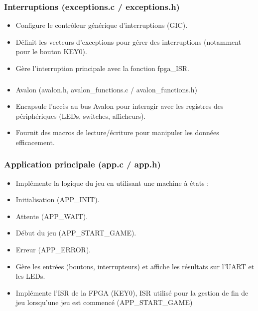 \documentclass[a4paper,12pt]{article}
\begin{document}
\subsubsection{Interruptions (exceptions.c / exceptions.h)}

\begin{itemize}
    \item Configure le contrôleur générique d’interruptions (GIC).
    \item Définit les vecteurs d’exceptions pour gérer des interruptions (notamment pour le bouton KEY0).
    \item Gère l'interruption principale avec la fonction fpga\_ISR.
\end{itemize}

\subsubsection{}

\begin{itemize}
    \item Avalon (avalon.h, avalon\_functions.c / avalon\_functions.h)
    \item Encapsule l’accès au bus Avalon pour interagir avec les registres des périphériques (LEDs, switches, afficheurs).
    \item Fournit des macros de lecture/écriture pour manipuler les données efficacement.
\end{itemize}

\subsubsection{Application principale (app.c / app.h)}

\begin{itemize}
    \item Implémente la logique du jeu en utilisant une machine à états :
    \item Initialisation (APP\_INIT).
    \item Attente (APP\_WAIT).
    \item Début du jeu (APP\_START\_GAME).
    \item Erreur (APP\_ERROR).
    \item Gère les entrées (boutons, interrupteurs) et affiche les résultats sur l’UART et les LEDs.
    \item Implémente l'ISR de la FPGA (KEY0), ISR utilisé pour la gestion de fin de jeu lorsqu'une jeu est commencé (APP\_START\_GAME)
\end{itemize}
\end{document}

